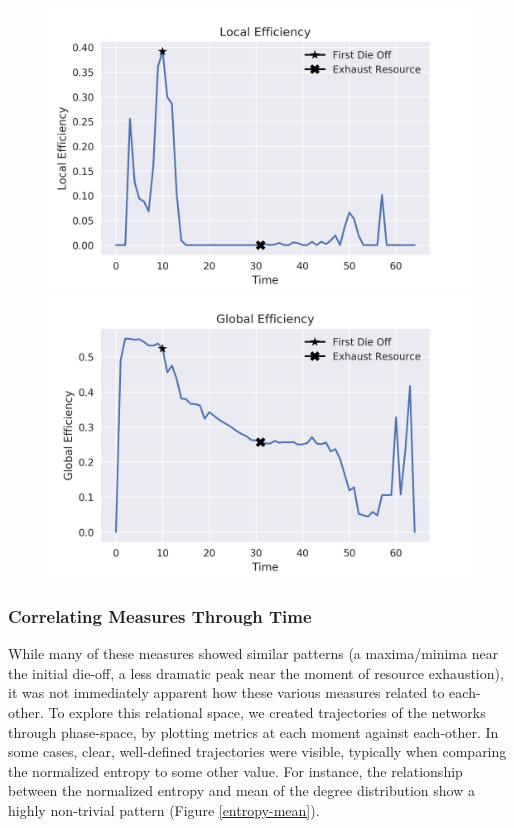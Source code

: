 \documentclass{paper}
\begin{document}
	\begin{figure}[h]
		\centering
		\includegraphics[scale=0.75]{local_efficiency.png}
		\includegraphics[scale=0.75]{global_efficiency.png}
		\label{efficiency}
	\end{figure}
	
	\subsubsection{Correlating Measures Through Time}
	While many of these measures showed similar patterns (a maxima/minima near the initial die-off, a less dramatic peak near the moment of resource exhaustion), it was not immediately apparent how these various measures related to each-other. To explore this relational space, we created trajectories of the networks through phase-space, by plotting metrics at each moment against each-other. In some cases, clear, well-defined trajectories were visible, typically when comparing the normalized entropy to some other value. For instance, the relationship between the normalized entropy and mean of the degree distribution show a highly non-trivial pattern (Figure \ref{entropy-mean}). 
	
\end{document}
